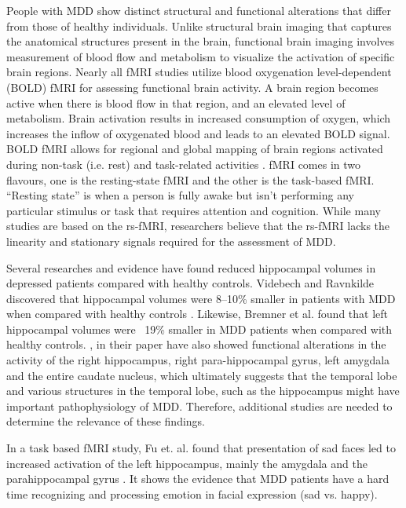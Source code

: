﻿\documentclass[12pt]{article}
\begin{document}
People with MDD show distinct structural and functional alterations
that differ from those of healthy individuals. Unlike structural brain
imaging that captures the anatomical structures present in the brain,
functional brain imaging involves measurement of blood flow and
metabolism to visualize the activation of specific brain
regions. Nearly all fMRI studies utilize blood oxygenation
level-dependent (BOLD) fMRI for assessing functional brain
activity. A brain region becomes active when there is blood flow in
that region, and an elevated level of metabolism. Brain activation
results in increased consumption of oxygen, which increases the inflow
of oxygenated blood and leads to an elevated BOLD signal. BOLD fMRI
allows for regional and global mapping of brain regions activated
during non-task (i.e. rest) and task-related activities
\cite{zhuo2019rise}. fMRI comes in two flavours, one is the
resting-state fMRI and the other is the task-based fMRI. ``Resting
state'' is when a person is fully awake but isn’t performing any
particular stimulus or task that requires attention and
cognition. While many studies are based on the rs-fMRI, researchers
believe that the rs-fMRI lacks the linearity and stationary signals
required for the assessment of MDD.

\newpage
Several researches and evidence have found reduced hippocampal volumes
in depressed patients compared with healthy controls. Videbech and
Ravnkilde discovered that hippocampal volumes were 8–10\% smaller in
patients with MDD when compared with healthy controls
\cite{zhuo2019rise}. Likewise, Bremner et al. found that left
hippocampal volumes were ~19\% smaller in MDD patients when compared
with healthy controls\cite{zhuo2019rise}. \textcite{zhuo2019rise}, in
their paper have also showed functional alterations in the activity of
the right hippocampus, right para-hippocampal gyrus, left amygdala and
the entire caudate nucleus, which ultimately suggests that the
temporal lobe and various structures in the temporal lobe, such as the
hippocampus might have important pathophysiology of MDD. Therefore,
additional studies are needed to determine the relevance of these
findings.

In a task based fMRI study, Fu et. al. found that presentation of sad
faces led to increased activation of the left hippocampus, mainly the
amygdala and the parahippocampal gyrus \cite{correlation}. It shows
the evidence that MDD patients have a hard time recognizing and
processing emotion in facial expression (sad vs. happy).
\end{document}
